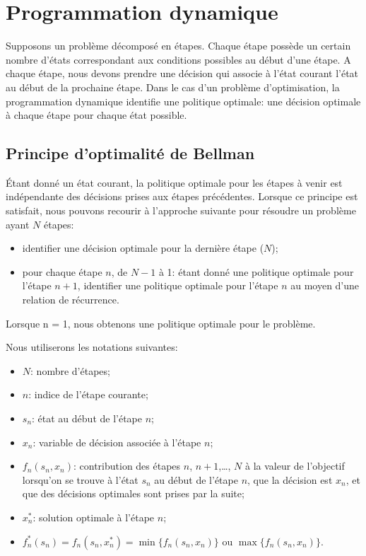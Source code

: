 \chapter{Programmation dynamique}

Supposons un problème décomposé en étapes.
Chaque étape possède un certain nombre d’états correspondant aux conditions possibles au début d’une étape.
A chaque étape, nous devons prendre une décision qui associe à l’état courant l’état au début de la prochaine étape.
Dans le cas d’un problème d’optimisation, la programmation dynamique identifie une politique optimale: une décision optimale à chaque étape pour chaque état possible.

\section{Principe d’optimalité de Bellman}

Étant donné un état courant, la politique optimale pour les étapes à venir est indépendante des
décisions prises aux étapes précédentes.
Lorsque ce principe est satisfait, nous pouvons recourir à l’approche suivante pour résoudre un problème ayant $N$ étapes:
\begin{itemize}
\item
identifier une décision optimale pour la dernière étape ($N$);
\item
pour chaque étape $n$, de $N-1$ à 1: étant donné une politique
optimale pour l’étape $n+1$, identifier une politique optimale
pour l’étape $n$ au moyen d’une relation de récurrence.
\end{itemize}
Lorsque n = 1, nous obtenons une politique optimale pour le problème.

Nous utiliserons les notations suivantes:
\begin{itemize}
\item
 $N$: nombre d’étapes;
\item
 $n$: indice de l’étape courante;
\item
 $s_n$: état au début de l’étape $n$;
\item
 $x_n$: variable de décision associée à l’étape $n$;
\item
 $f_n(s_n,x_n)$: contribution des étapes $n$, $n+1$,\ldots, $N$ à la valeur de l’objectif lorsqu’on se trouve à l’état $s_n$ au début de l’étape $n$, que la décision est $x_n$, et que des décisions optimales sont prises par la suite;
\item
$x_n^*$: solution optimale à l’étape $n$;
\item
 $f_n^*(s_n) = f_n(s_n,x_n^*) = \min \lbrace f_n(s_n,x_n) \rbrace$ ou $\max \lbrace f_n(s_n, x_n) \rbrace$.
\end{itemize}

